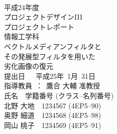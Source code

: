 

\begin{titlepage}
 \begin{center}
  ~\\
  \vspace{1cm}
  {\Large 
  平成24年度\\
 プロジェクトデザインIII\\
  プロジェクトレポート\\
情報工学科\\}
  \vspace{1.3in}
  {\Huge \gt 
ベクトルメディアンフィルタと\\
その発展型フィルタを用いた\\
劣化画像の復元\\
  }
  \vspace{2in}
  {\LARGE 
  提出日~~~平成25年~1月~31日\\
  \vspace{0.4in}
  指導教員~：~鷹合 大輔 准教授\\
 \vspace{0.9in}
  氏名　学籍番号 (クラス--名列番号)\\
  \vspace{2mm}
  北野 大地　1234567 (4EP5--90)\\
  奥野 細道　1234568 (4EP5--98)\\
  岡山 桃子　1234569 (4EP5--91)\\
  }
 \end{center}
\end{titlepage}
